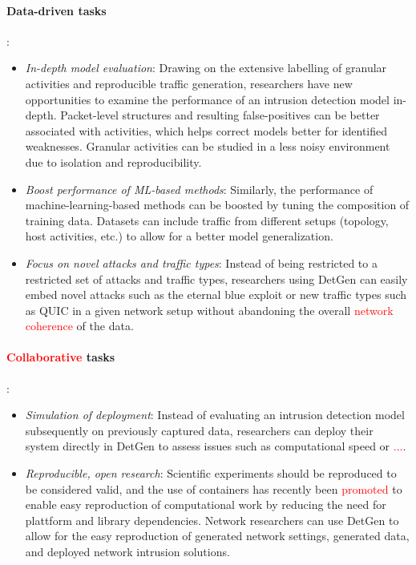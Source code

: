 \documentclass{article}
\begin{document}
\paragraph{Data-driven tasks}:
\begin{itemize}

\item \textit{In-depth model evaluation}:
Drawing on the extensive labelling of granular activities and reproducible traffic generation, researchers have new opportunities to examine the performance of an intrusion detection model in-depth. Packet-level structures and resulting false-positives can be better associated with activities, which helps correct models better for identified weaknesses. Granular activities can be studied in a less noisy environment due to isolation and reproducibility. 


\item \textit{Boost performance of ML-based methods}: Similarly, the performance of machine-learning-based methods can be boosted by tuning the composition of training data. Datasets can include traffic from different setups (topology, host activities, etc.) to allow for a better model generalization.

\item \textit{Focus on novel attacks and traffic types}: Instead of being restricted to a restricted set of attacks and traffic types, researchers using DetGen can easily embed novel attacks such as the eternal blue exploit or new traffic types such as QUIC in a given network setup without abandoning the overall \textcolor{red}{network coherence} of the data. 


\end{itemize}

\paragraph{\textcolor{red}{Collaborative} tasks}: 

\begin{itemize}
\item \textit{Simulation of deployment}: Instead of evaluating an intrusion detection model subsequently on previously captured data, researchers can deploy their system directly in DetGen to assess issues such as computational speed or \textcolor{red}{...}.



\item \textit{Reproducible, open research}: Scientific experiments should be reproduced to be considered valid, and the use of containers has recently been \textcolor{red}{promoted} to enable easy reproduction of computational work by reducing the need for plattform and library dependencies. Network researchers can use DetGen to allow for the easy reproduction of generated network settings, generated data, and deployed network intrusion solutions. 


\end{itemize}
\end{document}

